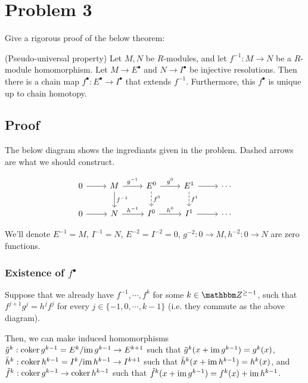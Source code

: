\section*{Problem 3}

Give a rigorous proof of the below theorem:

\begin{theorem}
(Pseudo-universal property)
Let \(M, N\) be \(R\)-modules, and let \(f^{-1}: M \to N\) be a \(R\)-module homomorphism.
Let \(M \to E^\bullet\) and \(N \to I^\bullet\) be injective resolutions.
Then there is a chain map \(f^\bullet : E^\bullet \to I^\bullet\)
that extends \(f^{-1}\).
Furthermore, this \(f^\bullet\) is unique up to chain homotopy.
\end{theorem}

\subsection*{Proof}

The below diagram shows the ingrediants given in the problem.
Dashed arrows are what we should construct.

\[\begin{tikzcd}
  0 \ar{r} & M \ar["f^{-1}"]{d} \ar["g^{-1}"]{r} & E^0 \ar[dashed, "f^0"]{d} \ar["g^0"]{r} & E^1 \ar[dashed, "f^1"]{d} \ar{r} & \cdots \\
  0 \ar{r} & N \ar["h^{-1}"]{r} & I^0 \ar["h^0"]{r} & I^1 \ar{r} & \cdots
\end{tikzcd}\]

We'll denote \(E^{-1} = M\), \(I^{-1} = N\), \(E^{-2} = I^{-2} = 0\), \(g^{-2}: 0 \to M, h^{-2}: 0 \to N\) are zero functions.

\subsubsection*{Existence of \(f^\bullet\)}

Suppose that we already have \(f^{-1}, \cdots, f^{k}\) for some \(k \in \bbZ^{\ge -1}\),
such that \(f^{j + 1} g^{j} = h^{j} f^j\) for every \(j \in \{-1, 0, \cdots, k - 1\}\) (i.e. they commute as the above diagram).

Then, we can make induced homomorphisms
\(\tilde g^{k}: \textnormal{coker}\, g^{k - 1} = E^{k} / \textnormal{im}\, g^{k - 1} \to E^{k + 1}\) such that \(\tilde g^{k}(x + \textnormal{im}\, g^{k - 1}) = g^{k}(x)\),
\(\tilde h^{k}: \textnormal{coker}\, h^{k - 1} = I^{k} / \textnormal{im}\, h^{k - 1} \to I^{k + 1}\) such that \(\tilde h^{k}(x + \textnormal{im}\, h^{k - 1}) = h^{k}(x)\),
and
\(\tilde f^{k}: \textnormal{coker}\, g^{k - 1} \to \textnormal{coker}\, h^{k - 1}\) such that
\(\tilde f^{k}(x + \textnormal{im}\, g^{k - 1}) = f^{k}(x) + \textnormal{im}\, h^{k - 1}\).

